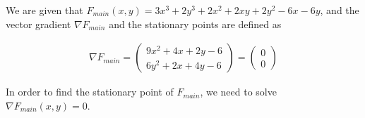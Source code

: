 \documentclass[../main.tex]{subfiles}
\begin{document}
    We are given that $F_{main}(x,y) = 3x^{3} + 2y^{3} + 2x^{2} + 2xy + 2y^{2} - 6x - 6y$, and the
    vector gradient $\nabla F_{main}$ and the stationary points are defined as \\
    \begin{center*}
        \begin{align*}
            \nabla F_{main} =
            \begin{pmatrix}
                9x^{2} + 4x + 2y - 6 \\
                6y^{2} + 2x + 4y - 6
            \end{pmatrix}
            =
            \begin{pmatrix}
                0 \\
                0
            \end{pmatrix}
        \end{align*}
    \end{center*}
    In order to find the stationary point of $F_{main}$, we need to solve $\nabla F_{main}(x,y) = 0$.
    
\end{document}
